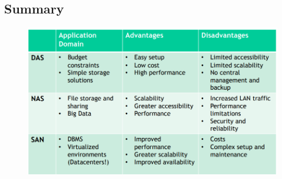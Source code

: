 \subsection{Summary}
\begin{figure}[H]
    \centering
    \includegraphics[width=1\linewidth]{images/stor.png}
\end{figure}